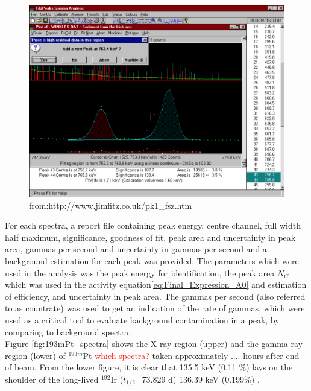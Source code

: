 \begin{figure}
    \centering
    \includegraphics[width=12cm]{Analysis/fitz_example.png}
    \caption{from:http://www.jimfitz.co.uk/pk1_fsz.htm}
    \label{fig:fitz_example}
\end{figure}

\noindent For each spectra, a report file containing peak energy, centre channel, full width half maximum, significance, goodness of fit, peak area and uncertainty in peak area, gammas per second and uncertainty in gammas per second and a background estimation for each peak was provided. The parameters which were used in the analysis was the peak energy for identification, the peak area $N_C$ which was used in the activity equation\ref{eq:Final_Expression_A0} and estimation of efficiency, and uncertainty in peak area. The gammas per second (also referred to as countrate) was used to get an indication of the rate of gammas, which were used as a critical tool to evaluate background contamination in a peak, by comparing to background spectra.  \\ 

\noindent 
Figure \ref{fig:193mPt_spectra} shows the X-ray region (upper) and the gamma-ray region (lower) of $^{193m}$Pt \textcolor{red}{which spectra?} taken approximately .... hours after end of beam. From the lower figure, it is clear that 135.5 keV (0.11 \%) lays on the shoulder of the long-lived $^{192}$Ir ($t_{1/2}$=73.829 d) 136.39 keV (0.199\%) \cite{Baglin2012, ShamsuzzohaBasunia2017a}. 

